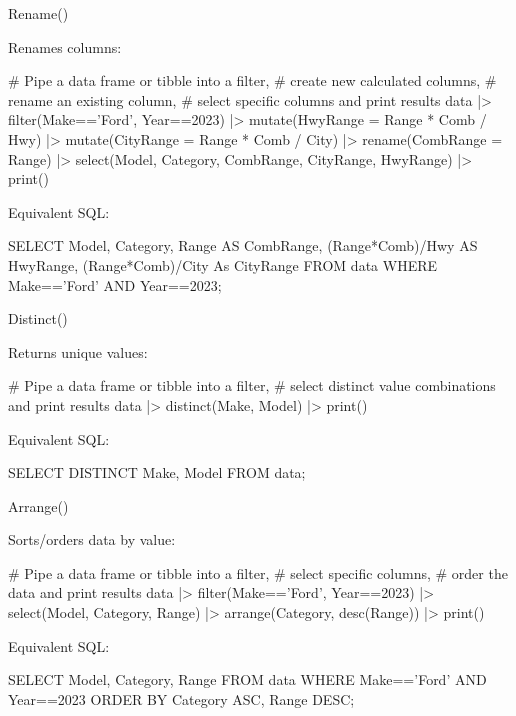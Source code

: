 \documentclass[ignorenonframetext,xcolor=x11names]{beamer}
\begin{document}
\begin{frame}[label=full,fragile]{Rename()}

Renames columns:

\begin{Rcode}
# Pipe a data frame or tibble into a filter,
# create new calculated columns,
# rename an existing column,
# select specific columns and print results
data |> 
  filter(Make=='Ford', Year==2023) |> 
  mutate(HwyRange = Range * Comb / Hwy) |>
  mutate(CityRange = Range * Comb / City) |>
  rename(CombRange = Range) |>
  select(Model, Category, CombRange, CityRange, HwyRange) |>
  print()
\end{Rcode}

Equivalent SQL:

\begin{sqlcode}
SELECT Model, Category, 
      Range AS CombRange,
      (Range*Comb)/Hwy AS HwyRange, 
      (Range*Comb)/City As CityRange
   FROM data 
   WHERE Make=='Ford' AND Year==2023;
\end{sqlcode}
\end{frame}

\begin{frame}[label=full,fragile]{Distinct()}

Returns unique values:

\begin{Rcode}
# Pipe a data frame or tibble into a filter,
# select distinct value combinations and print results
data |> 
  distinct(Make, Model) |>
  print()
\end{Rcode}

Equivalent SQL:

\begin{sqlcode}
SELECT DISTINCT Make, Model 
  FROM data;
\end{sqlcode}
\end{frame}

\begin{frame}[label=full,fragile]{Arrange()}

Sorts/orders data by value:

\begin{Rcode}
# Pipe a data frame or tibble into a filter,
# select specific columns,
# order the data and print results
data |> 
  filter(Make=='Ford', Year==2023) |> 
  select(Model, Category, Range) |>
  arrange(Category, desc(Range)) |>
  print()
\end{Rcode}

Equivalent SQL:

\begin{sqlcode}
SELECT Model, Category, Range
   FROM data 
   WHERE Make=='Ford' AND Year==2023
   ORDER BY Category ASC, Range DESC;
\end{sqlcode}
\end{frame}
\end{document}
